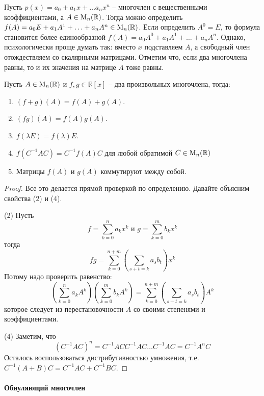 Пусть $p(x) = a_0+a_1x+\ldots a_n x^n$ -- многочлен с вещественными коэффициентами, а $A\in\operatorname{M}_{n}(\mathbb R)$.
Тогда можно определить $f(A)= a_0 E + a_1 A^1 + \ldots + a_n A^n\in\operatorname{M}_{n}(\mathbb R)$.
Если определить $A^0 = E$, то формула становится более единообразной $f(A)= a_0 A^0 + a_1 A^1 + \ldots + a_n A^n$.
Однако, психологически проще думать так: вместо $x$ подставляем $A$, а свободный член отождествляем со скалярными матрицами.
Отметим что, если два многочлена равны, то и их значения на матрице $A$ тоже равны.

\begin{claim*}
Пусть $A\in\operatorname{M}_{n}(\mathbb R)$ и $f,g\in\mathbb R[x]$ -- два произвольных многочлена, тогда:
\begin{enumerate}
\item $(f+g)(A) = f(A) + g(A)$.

\item $(fg)(A) = f(A)g(A)$.

\item $f(\lambda E) = f(\lambda)E$.

\item $f(C^{-1}AC) = C^{-1}f(A)C$ для любой обратимой $C\in \operatorname{M}_{n}(\mathbb R)$

\item Матрицы $f(A)$ и $g(A)$ коммутируют между собой.
\end{enumerate}
\end{claim*}
\begin{proof}
Все это делается прямой проверкой по определению.
Давайте объясним свойства (2) и (4).

(2) Пусть 
\[
f = \sum_{k=0}^na_k x^k\text{ и }g = \sum_{k=0}^m b_k x^k
\]
тогда 
\[
fg = \sum_{k=0}^{n + m} \left(\sum_{s + t = k }a_s b_t\right) x^k
\]
Потому надо проверить равенство:
\[
\left(\sum_{k=0}^n a_k A^k\right)\left(\sum_{k=0}^mb_k A^k\right) = \sum_{k=0}^{n+m}\left(\sum_{s+t = k} a_s b_t\right)A^k
\]
которое следует из перестановочности $A$ со своими степенями и коэффициентами.

(4) Заметим, что
\[
(C^{-1}AC)^n = C^{-1}ACC^{-1}AC\ldots C^{-1}AC = C^{-1}A^nC
\]
Осталось воспользоваться дистрибутивностью умножения, т.е. $C^{-1}(A + B)C = C^{-1}AC + C^{-1}BC$.
\end{proof}

\paragraph{Обнуляющий многочлен}

